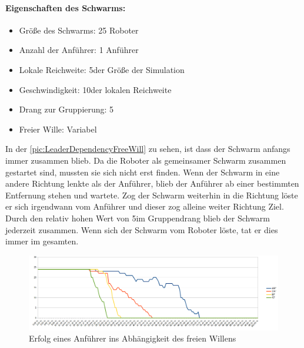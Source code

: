 \paragraph*{Eigenschaften des Schwarms:}
\begin{itemize}
	\item Größe des Schwarms: 25 Roboter
	\item Anzahl der Anführer: 1 Anführer
	\item Lokale Reichweite: 5\per der Größe der Simulation
	\item Geschwindigkeit: 10\per der lokalen Reichweite
	\item Drang zur Gruppierung: 5\per
	\item Freier Wille: Variabel
\end{itemize}

In der \autoref{pic:LeaderDependencyFreeWill} zu sehen, ist dass der Schwarm anfangs immer zusammen blieb. Da die Roboter als gemeinsamer Schwarm zusammen gestartet sind, mussten sie sich nicht erst finden. Wenn der Schwarm in eine andere Richtung lenkte als der Anführer, blieb der Anführer ab einer bestimmten Entfernung stehen und wartete. Zog der Schwarm weiterhin in die Richtung löste er sich irgendwann vom Anführer und dieser zog alleine weiter Richtung Ziel. Durch den relativ hohen Wert von 5\per im Gruppendrang blieb der Schwarm jederzeit zusammen. Wenn sich der Schwarm vom Roboter löste, tat er dies immer im gesamten.

\begin{figure}
	\includegraphics[width=\textwidth, height=\statisticHeight]{graphics/Statistics/Leader/DependencyFreeWill.png}
	\caption{Erfolg eines Anführer ins Abhängigkeit des freien Willens}
	\label{pic:LeaderDependencyFreeWill}
\end{figure}

